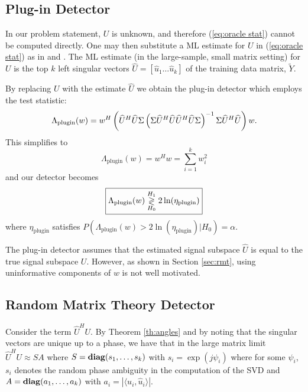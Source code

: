 \subsection{Plug-in Detector}

In our problem statement, $U$ is unknown, and therefore (\ref{eq:oracle stat}) cannot be computed directly. One may then substitute a ML estimate for $U$ in (\ref{eq:oracle stat}) as in \cite{jin2005cfar} and \cite{mcwhorter2003matched}. The ML estimate (in the large-sample, small matrix setting) for $U$ is the top $k$ left singular vectors $\widehat{U}=[\widehat{u}_1 \dots \widehat{u}_{k}]$ of the training data matrix, $\widetilde{Y}$.

By replacing $U$ with the estimate $\widehat{U}$ we obtain the plug-in detector which employs the test statistic:
\begin{equation*}
\Lambda_{\text{plugin}}(w)= w^H\left(\widehat{U}^H\widehat{U}\Sigma\left(\Sigma\widehat{U}^H\widehat{U}\widehat{U}^H\widehat{U}\Sigma\right)^{-1}\Sigma\widehat{U}^H\widehat{U}\right)w.\\
\end{equation*}
This simplifies to
\begin{equation}\label{eq:plugin stat}
\boxed{\Lambda_{\text{plugin}}(w) = w^Hw=\sum_{i=1}^kw_i^2}
\end{equation}
and our detector becomes
\begin{equation}\label{eq:plugin classifier}
\boxed{\Lambda_{\text{plugin}}(w) \overset{H_1}{\underset{H_0}{\gtrless}} 2\ln(\eta_{\text{plugin}})}
\end{equation}
where $\eta_{\text{plugin}}$ satisfies $P(\Lambda_{\text{plugin}}(w)>2\ln\left(\eta_{\text{plugin}}\right)|H_0)=\alpha$.

The plug-in detector assumes that the estimated signal subspace $\widehat{U}$ is equal to the true signal subspace $U$. However, as shown in Section \ref{sec:rmt}, using uninformative components of $w$ is not well motivated.

\subsection{Random Matrix Theory Detector}\label{subsec:optdet}

Consider the term $\widehat{U}^HU$. By Theorem \ref{th:angles} and by noting that the singular vectors are unique up to a phase, we have that in the large matrix limit $\widehat{U}^HU \approx SA$ where $S=\mathop{\bf diag}(s_1,\dots,s_{k})$ with $s_i=\exp(j \psi_i)$ where for some $\psi_{i}$, $s_i$ denotes the random phase ambiguity in the computation of the SVD and $A=\mathop{\bf diag}(a_1,\dots,a_k)$ with $a_i=|\langle u_i,\widehat{u}_i\rangle|$.

